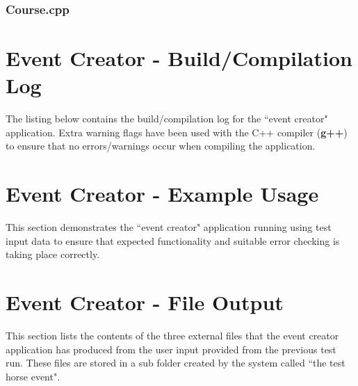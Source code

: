 \documentclass[a4paper, 10pt]{article}
\begin{document}
\clearpage
\subsubsection{Course.cpp}


\clearpage
\section{Event Creator - Build/Compilation Log}

The listing below contains the build/compilation log for the ``event creator" application. Extra warning flags have been used with the C++ compiler (\textbf{g++}) to ensure that no errors/warnings occur when compiling the application.



\clearpage
\section{Event Creator - Example Usage}
This section demonstrates the ``event creator" application running using test input data to ensure that expected functionality and suitable error checking is taking place correctly.



\clearpage
\section{Event Creator - File Output}

This section lists the contents of the three external files that the event creator application has produced from the user input provided from the previous test run. These files are stored in a sub folder created by the system called ``the test horse event".




\end{document}
